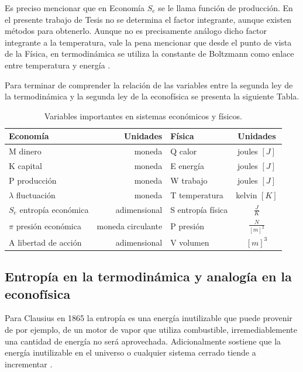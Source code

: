 Es preciso mencionar que en Economía $S_e$ se le llama función de producción. En el presente trabajo de Tesis no se determina el factor integrante, aunque existen métodos para obtenerlo. Aunque no es precisamente análogo dicho factor integrante a la temperatura, vale la pena mencionar que desde el punto de vista de la Física, en termodinámica se utiliza la constante de Boltzmann como enlace entre temperatura y energía \citep[][pagina 166]{richmond}. 

Para terminar de comprender la relación de las variables entre la segunda ley de la termodinámica y la segunda ley de la econofísica se presenta la siguiente Tabla. 

\begin{table}	
	\begin{center}
		\begin{tabular}{ |l |r | l | c| }
			\hline
			Economía &  Unidades & Física & Unidades  \\ \hline
			M dinero & moneda & Q calor & joules $[J]$ \\
			K capital & moneda  & E energía & joules $[J]$\\ 
			P producción &  moneda   & W trabajo & joules $[J]$ \\
			$\lambda$ fluctuación & moneda & T temperatura & kelvin $[K]$\\ 
			$S_e$ entropía económica & adimensional & S entropía física & $\frac{J}{K}$ \\
			$\pi$ presión económica & moneda circulante & P presión & $\frac{N}{[m]^{2}}$\\
			A libertad de acción & adimensional & V volumen & $[m]^{3}$ \\
			\hline
		\end{tabular}
		\label{tab_analogiasFisEcono}
		\caption{Variables importantes en sistemas económicos y físicos.}
	\end{center}
\end{table}

\subsection{Entropía en la termodinámica y analogía en la econof\'isica} 

Para Clausius en 1865 la entropía es una energía inutilizable que puede provenir de por ejemplo, de un motor de vapor que utiliza combustible, irremediablemente una cantidad de energía no será aprovechada. Adicionalmente sostiene que la energía inutilizable en el universo o cualquier sistema cerrado tiende a incrementar \citep[][pagina 21]{cottrell_classical_2009}. 

